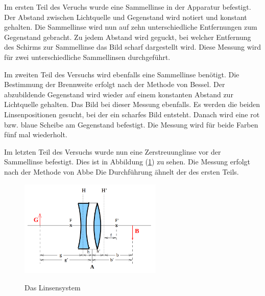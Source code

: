 Im ersten Teil des Veruchs wurde eine Sammellinse in der Apparatur befestigt.
Der Abstand zwischen Lichtquelle und Gegenstand wird notiert und konstant gehalten.
Die Sammellinse wird nun auf zehn unterschiedliche Entfernungen zum Gegenstand gebracht.
Zu jedem Abstand wird geguckt,
bei welcher Entfernung des Schirms zur Sammellinse das Bild scharf dargestellt wird.
Diese Messung wird für zwei unterschiedliche Sammellinsen durchgeführt.

Im zweiten Teil des Versuchs wird ebenfalls eine Sammellinse benötigt.
Die Bestimmung der Brennweite erfolgt nach der Methode von Bessel.
Der abzubildende Gegenstand wird wieder auf einem konstanten Abstand zur Lichtquelle gehalten.
Das Bild bei dieser Messung ebenfalls.
Es werden die beiden Linsenpositionen gesucht, bei der ein scharfes Bild entsteht.
Danach wird eine rot bzw. blaue Scheibe am Gegenstand befestigt.
Die Messung wird für beide Farben fünf mal wiederholt.

Im letzten Teil des Versuchs wurde nun eine Zerstreuunglinse vor der Sammellinse befestigt.
Dies ist in Abbildung (\ref{fig:linsys}) zu sehen.
Die Messung erfolgt nach der Methode von Abbe
Die Durchführung ähnelt der des ersten Teils.
\begin{figure}
\centering
\includegraphics[height=4.60cm]{linsensystem.png}
\caption{Das Linsensystem}\cite{on1}
\label{fig:linsys}
\end{figure}
